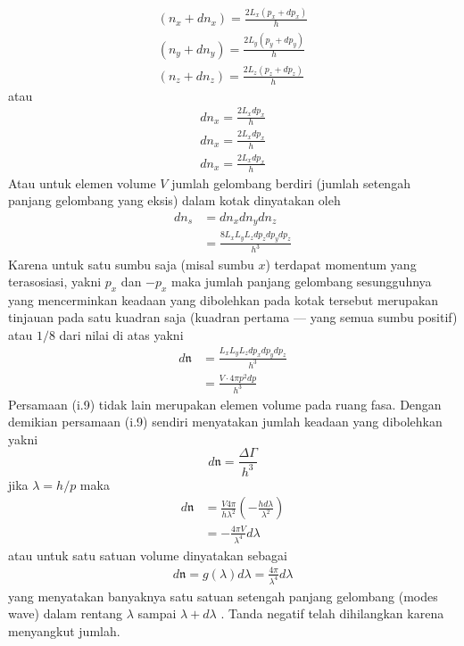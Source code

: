 \documentclass[a4paper , 12 pt]{article}
\begin{document}
\begin{enumerate}
\begin{align}
(n_x + d n_x ) = \frac{2 L_x (p_x + dp_x)}{h} \nonumber \\
(n_y + d n_y ) = \frac{2 L_y (p_y + dp_y)}{h} \nonumber \tag{i.6} \\ 
(n_z + d n_z ) = \frac{2 L_z (p_z + dp_z)}{h} \nonumber
\end{align}
atau 
\begin{align}
d n_x = \frac{2 L_x d p_x}{h} \nonumber \\
d n_x = \frac{2 L_x d p_x}{h} \nonumber \tag{i.7} \\
d n_x = \frac{2 L_x d p_x}{h} \nonumber 
\end{align}
Atau untuk elemen volume $V$ jumlah gelombang berdiri (jumlah setengah panjang gelombang yang eksis) dalam kotak dinyatakan oleh
\begin{align}
d n_s &  = d n_x d n_y d n_z  \nonumber \\
 & = \frac{8 L_x L_y L_z d p_z d p_y d p_z}{h^3} \tag{i.8}
\end{align}
Karena untuk satu sumbu saja (misal sumbu $x$) terdapat momentum yang terasosiasi, yakni $p_x$ dan $-p_x$ maka jumlah panjang gelombang sesungguhnya  yang mencerminkan keadaan yang dibolehkan pada kotak tersebut merupakan tinjauan pada satu kuadran saja (kuadran pertama --- yang semua sumbu positif) atau $1/8$ dari nilai di atas yakni 
\begin{align}
d \mathfrak{n}& = \frac{L_x L_y L_z d p_x d p_y d p_z}{h^3} \nonumber \\ 
& = \frac{V \cdot 4 \pi p^2 dp}{h^3}\tag{i.9}
\end{align}
Persamaan (i.9) tidak lain merupakan elemen volume pada ruang fasa. Dengan demikian persamaan (i.9) sendiri menyatakan jumlah keadaan yang dibolehkan yakni
\[
d \mathfrak{n} = \frac{\Delta \Gamma}{h^3} \tag{i.10}
\]
jika $\lambda = h/p $ maka 
\begin{align}
d \mathfrak{n}& = \frac{V 4 \pi }{h \lambda^2} \left( - \frac{h d\lambda}{\lambda^2} \right) \nonumber \\
& = - \frac{4 \pi V}{\lambda^4} d\lambda  \tag{i.11}
\end{align}
atau untuk satu satuan volume dinyatakan sebagai 
\begin{align}
d \mathfrak{n} =  g(\lambda) d \lambda =  \frac{4 \pi }{\lambda^4} d\lambda  \tag{i.12}
\end{align}
yang menyatakan banyaknya satu satuan setengah panjang gelombang (modes wave) dalam rentang  $\lambda$ sampai $\lambda + d \lambda$ 
. Tanda negatif telah dihilangkan karena menyangkut jumlah. 


\end{enumerate}
\end{document}
